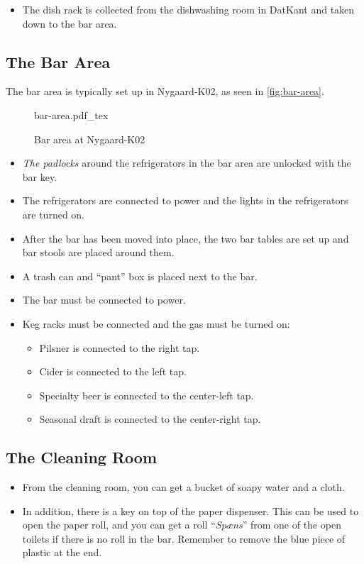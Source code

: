 \begin{itemize}
	\item The dish rack is collected from the dishwashing room in DatKant and taken down to the bar area.
\end{itemize}

\subsection{The Bar Area}
\label{sec:pre:bar-area}

The bar area is typically set up in Nygaard-K02, as seen in \autoref{fig:bar-area}.

\begin{figure}[t]
	\centering
	\def\svgwidth{\columnwidth}
	{\small{bar-area.pdf_tex}}
	\caption{Bar area at Nygaard-K02}
	\label{fig:bar-area}
\end{figure}

\begin{itemize}
    \item \textit{The padlocks} around the refrigerators in the bar area are unlocked with the bar key.
	\item The refrigerators are connected to power and the lights in the refrigerators are turned on.
	\item After the bar has been moved into place, the two bar tables are set up and bar stools are placed around them.
	\item A trash can and ``pant'' box is placed next to the bar.
	\item The bar must be connected to power.
	\item Keg racks must be connected and the gas must be turned on:
	\begin{itemize}
		\item Pilsner is connected to the right tap.
		\item Cider is connected to the left tap.
		\item Specialty beer is connected to the center-left tap.
		\item Seasonal draft is connected to the center-right tap.
	\end{itemize}
\end{itemize}

\subsection{The Cleaning Room}
\label{sec:pre:cleaning-room}

\begin{itemize}
	\item From the cleaning room, you can get a bucket of soapy water and a cloth.
	\item In addition, there is a key on top of the paper dispenser. This can be used to
	open the paper roll, and you can get a roll ``\textit{Spæns}''
	from one of the open toilets if there is no roll in the bar.
	Remember to remove the blue piece of plastic at the end.
\end{itemize}
